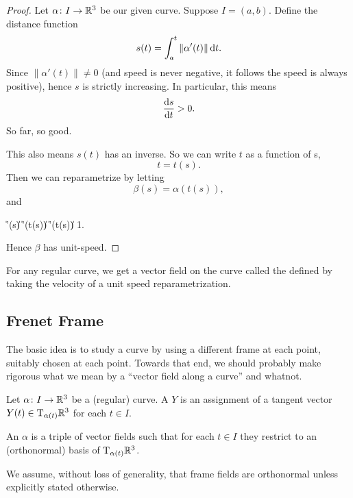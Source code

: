 \begin{proof}
Let $\alpha\colon I\to\mathbb{R}^{3}$ be our given curve. Suppose $I=(a,b)$.
Define the distance function
\begin{equation}
s(t) = \int^{t}_{a}\|\alpha'(t)\|\,\mathrm{d} t.
\end{equation}
Since $\|\alpha'(t)\|\neq0$ (and speed is never negative, it follows the
speed is always positive), hence $s$ is strictly increasing. In
particular, this means
\begin{equation}
\frac{\mathrm{d} s}{\mathrm{d} t}>0.
\end{equation}
So far, so good.

This also means $s(t)$ has an inverse. So we can write $t$ as a function
of s,
\begin{equation}
t = t(s).
\end{equation}
Then we can reparametrize by letting
\begin{equation}
\beta(s) = \alpha(t(s)),
\end{equation}
and
\begin{calculation}
  \|\beta'(s)\|
  \displaystyle\left\|\alpha'(t(s))\right\|
  \displaystyle\left\|\alpha'(t(s))\right\|
  \displaystyle{}
  1.
\end{calculation}
Hence $\beta$ has unit-speed.
\end{proof}

\begin{remark}
For any regular curve, we get a vector field on the curve called the
 defined by taking the velocity of a unit
speed reparametrization.
\end{remark}

\subsection{Frenet Frame}

\M
The basic idea is to study a curve by using a different frame at each
point, suitably chosen at each point. Towards that end, we should
probably make rigorous what we mean by a ``vector field along a curve''
and whatnot.

\begin{definition}
Let $\alpha\colon I\to\mathbb{R}^{3}$ be a (regular) curve.
A  $Y$ is an assignment of a tangent
vector $Y(t)\in\mathrm{T}_{\alpha(t)}\mathbb{R}^{3}$ for each $t\in I$.

An  $\alpha$ is a triple of
vector fields such that for each $t\in I$ they restrict to an
(orthonormal) basis of $\mathrm{T}_{\alpha(t)}\mathbb{R}^{3}$.

We assume, without loss of generality, that frame fields are orthonormal
unless explicitly stated otherwise.
\end{definition}

